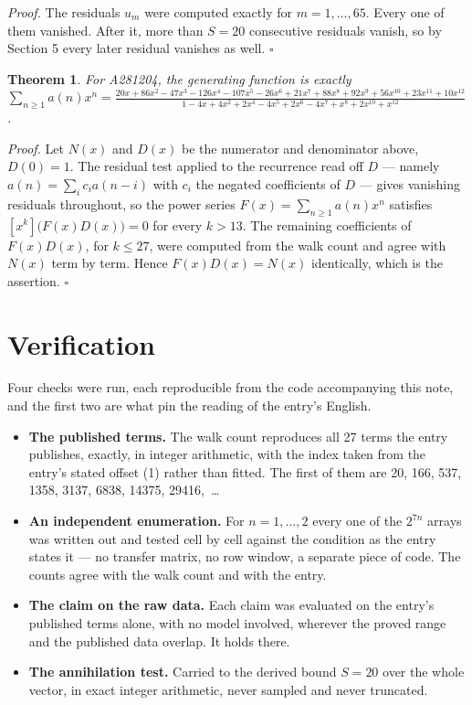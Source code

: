 \documentclass[11pt]{article}
\newtheorem{theorem}{Theorem}
\theoremstyle{definition}
\begin{document}
{\itshape Proof.} The residuals $u_m$ were computed exactly for $m = 1,\dots,65$. Every one of them vanished. After it, more than $S = 20$ consecutive residuals vanish, so by Section 5 every later residual vanishes as well. $\square$

\begin{theorem} For A281204, the generating function is exactly $\sum_{n\ge 1} a(n)x^n = \frac{20x + 86x^{2} - 47x^{3} - 126x^{4} - 107x^{5} - 26x^{6} + 21x^{7} + 88x^{8} + 92x^{9} + 56x^{10} + 23x^{11} + 10x^{12}}{1 - 4x + 4x^{2} + 2x^{4} - 4x^{5} + 2x^{6} - 4x^{7} + x^{8} + 2x^{10} + x^{12}}$.\end{theorem}

{\itshape Proof.} Let $N(x)$ and $D(x)$ be the numerator and denominator above, $D(0)=1$. The residual test applied to the recurrence read off $D$ --- namely $a(n) = \sum_i c_i a(n-i)$ with $c_i$ the negated coefficients of $D$ --- gives vanishing residuals throughout, so the power series $F(x)=\sum_{n\ge 1}a(n)x^n$ satisfies $[x^k]\bigl(F(x)D(x)\bigr) = 0$ for every $k > 13$. The remaining coefficients of $F(x)D(x)$, for $k \le 27$, were computed from the walk count and agree with $N(x)$ term by term. Hence $F(x)D(x) = N(x)$ identically, which is the assertion. $\square$

\section{Verification}

Four checks were run, each reproducible from the code accompanying this note, and the first two are what pin the reading of the entry's English.

\begin{itemize}

\item {\bfseries The published terms.} The walk count reproduces all 27 terms the entry publishes, exactly, in integer arithmetic, with the index taken from the entry's stated offset (1) rather than fitted. The first of them are 20, 166, 537, 1358, 3137, 6838, 14375, 29416,~\dots

\item {\bfseries An independent enumeration.} For $n = 1,\dots,2$ every one of the $2^{7n}$ arrays was written out and tested cell by cell against the condition as the entry states it --- no transfer matrix, no row window, a separate piece of code. The counts agree with the walk count and with the entry.

\item {\bfseries The claim on the raw data.} Each claim was evaluated on the entry's published terms alone, with no model involved, wherever the proved range and the published data overlap. It holds there.

\item {\bfseries The annihilation test.} Carried to the derived bound $S = 20$ over the whole vector, in exact integer arithmetic, never sampled and never truncated.

\end{itemize}
\end{document}
